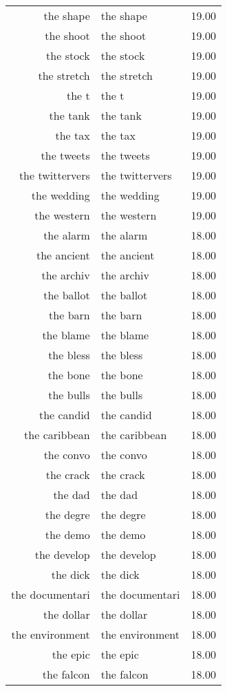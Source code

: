 \begin{table}[ht]
\begin{tabular}{rlr}
  the shape & the shape & 19.00 \\ 
  the shoot & the shoot & 19.00 \\ 
  the stock & the stock & 19.00 \\ 
  the stretch & the stretch & 19.00 \\ 
  the t & the t & 19.00 \\ 
  the tank & the tank & 19.00 \\ 
  the tax & the tax & 19.00 \\ 
  the tweets & the tweets & 19.00 \\ 
  the twittervers & the twittervers & 19.00 \\ 
  the wedding & the wedding & 19.00 \\ 
  the western & the western & 19.00 \\ 
  the alarm & the alarm & 18.00 \\ 
  the ancient & the ancient & 18.00 \\ 
  the archiv & the archiv & 18.00 \\ 
  the ballot & the ballot & 18.00 \\ 
  the barn & the barn & 18.00 \\ 
  the blame & the blame & 18.00 \\ 
  the bless & the bless & 18.00 \\ 
  the bone & the bone & 18.00 \\ 
  the bulls & the bulls & 18.00 \\ 
  the candid & the candid & 18.00 \\ 
  the caribbean & the caribbean & 18.00 \\ 
  the convo & the convo & 18.00 \\ 
  the crack & the crack & 18.00 \\ 
  the dad & the dad & 18.00 \\ 
  the degre & the degre & 18.00 \\ 
  the demo & the demo & 18.00 \\ 
  the develop & the develop & 18.00 \\ 
  the dick & the dick & 18.00 \\ 
  the documentari & the documentari & 18.00 \\ 
  the dollar & the dollar & 18.00 \\ 
  the environment & the environment & 18.00 \\ 
  the epic & the epic & 18.00 \\ 
  the falcon & the falcon & 18.00 \\ 

\end{tabular}
\end{table}
